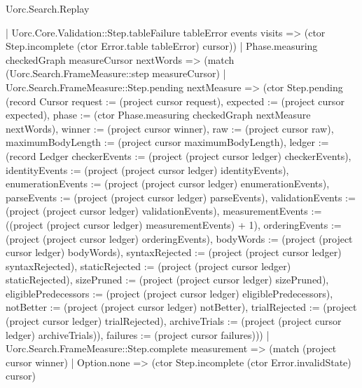 \begin{lexlean}{Uorc.Search.Replay}
\begin{semanticmodule}
{      | Uorc.Core.Validation::Step.tableFailure tableError events visits => (ctor Step.incomplete (ctor Error.table tableError) cursor))
    | Phase.measuring checkedGraph measureCursor nextWords => (match (Uorc.Search.FrameMeasure::step measureCursor)
      | Uorc.Search.FrameMeasure::Step.pending nextMeasure => (ctor Step.pending (record Cursor {request := (project cursor request), expected := (project cursor expected), phase := (ctor Phase.measuring checkedGraph nextMeasure nextWords), winner := (project cursor winner), raw := (project cursor raw), maximumBodyLength := (project cursor maximumBodyLength), ledger := (record Ledger {checkerEvents := (project (project cursor ledger) checkerEvents), identityEvents := (project (project cursor ledger) identityEvents), enumerationEvents := (project (project cursor ledger) enumerationEvents), parseEvents := (project (project cursor ledger) parseEvents), validationEvents := (project (project cursor ledger) validationEvents), measurementEvents := ((project (project cursor ledger) measurementEvents) + 1), orderingEvents := (project (project cursor ledger) orderingEvents), bodyWords := (project (project cursor ledger) bodyWords), syntaxRejected := (project (project cursor ledger) syntaxRejected), staticRejected := (project (project cursor ledger) staticRejected), sizePruned := (project (project cursor ledger) sizePruned), eligiblePredecessors := (project (project cursor ledger) eligiblePredecessors), notBetter := (project (project cursor ledger) notBetter), trialRejected := (project (project cursor ledger) trialRejected), archiveTrials := (project (project cursor ledger) archiveTrials)}), failures := (project cursor failures)}))
      | Uorc.Search.FrameMeasure::Step.complete measurement => (match (project cursor winner)
        | Option.none => (ctor Step.incomplete (ctor Error.invalidState) cursor)
}
\end{semanticmodule}
\end{lexlean}
